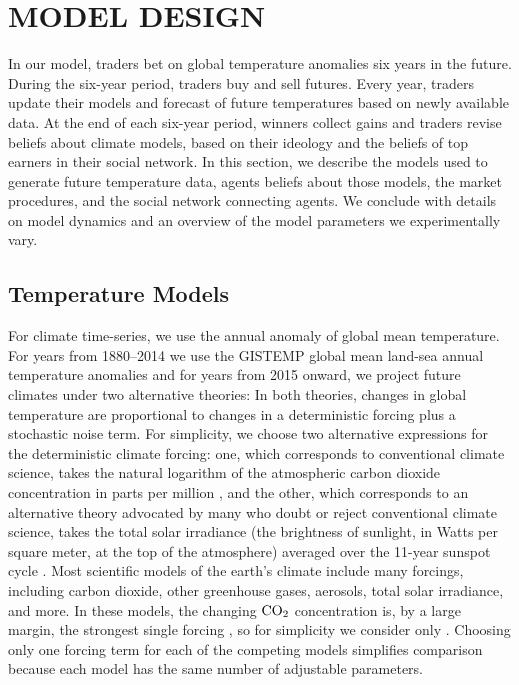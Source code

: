 \documentclass{article}\usepackage[]{graphicx}\usepackage[]{color}
\begin{document}
\section{MODEL DESIGN}

In our model, traders bet on global temperature anomalies six years in the future. 
During the six-year period, traders buy and sell futures. 
Every year, traders update their models and forecast of future temperatures based on newly available data. 
At the end of each six-year period, winners collect gains and traders revise beliefs about climate models, based on their ideology and the beliefs of top earners in their social network. 
In this section, we describe the models used to generate future temperature data, agents beliefs about those models, the market procedures, and the social network connecting agents. 
We conclude with details on model dynamics and an overview of the model parameters we experimentally vary.

\subsection{Temperature Models}
\label{sec:temp.models}

For climate time-series, we use the annual anomaly of global mean temperature. For years from 1880--2014 we use the GISTEMP global mean land-sea annual temperature anomalies  and for years from 2015 onward, we project future climates under two alternative theories: In both theories, changes in global temperature are proportional to changes in a deterministic forcing plus a stochastic noise term. For simplicity, we choose two alternative expressions for the deterministic climate forcing: one, which corresponds to conventional climate science, takes the natural logarithm of the atmospheric carbon dioxide concentration in parts per million , and the other, which corresponds to an alternative theory advocated by many who doubt or reject conventional climate science, takes the total solar irradiance (the brightness of sunlight, in Watts per square meter, at the top of the atmosphere) averaged over the 11-year sunspot cycle .  Most scientific models of the earth's climate include many forcings, including carbon dioxide, other greenhouse gases, aerosols, total solar irradiance, and more. In these models, the changing $\ce{CO2}$ concentration is, by a large margin, the strongest single forcing , so for simplicity we consider only . Choosing only one forcing term for each of the competing models simplifies comparison because each model has the same number of adjustable parameters.
\end{document}
